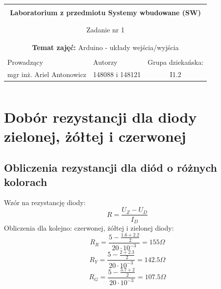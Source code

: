 \documentclass[polish,a4paper]{article}
\begin{document}
	\begin{center}
		\begin{tabular}{ p{} p{} p{} p{} p{} }
			
			&   &   &   &  \\
			\hline
			\multicolumn{5}{|c|}{}\\[-1ex]
			\multicolumn{5}{|c|}{{\LARGE \textbf{Laboratorium z przedmiotu Systemy wbudowane (SW)}}}\\
			\multicolumn{5}{|c|}{}\\[-1ex]
			\hline
			\hline
			
			\multicolumn{5}{|c|}{}\\[-1ex]
			\multicolumn{5}{|c|}{{\LARGE Zadanie nr 1}}\\
			\multicolumn{5}{|c|}{}\\[-1ex]
			\hline
			\hline
			
			\multicolumn{5}{|c|}{}\\[-1ex]
			\multicolumn{5}{|c|}{{\textbf{Temat zajęć:} Arduino - układy wejścia/wyjścia}}\\
			\multicolumn{5}{|c|}{}\\[-1ex]
			\hline
			\hline
			
			\multicolumn{1}{|l|}{Prowadzący} &
			\multicolumn{2}{|l|}{Autorzy} &
			\multicolumn{2}{|l|}{Grupa dziekańska:} \\
			\multicolumn{1}{|c|}{mgr inż. Ariel Antonowicz} &
			\multicolumn{2}{|c|}{148088 i 148121} &
			\multicolumn{2}{|c|}{I1.2} \\
			\hline
			\hline
		\end{tabular}
	\end{center}
	\[\]
	\section{Dobór rezystancji dla diody zielonej, żółtej i czerwonej}
	\subsection{Obliczenia rezystancji dla diód o różnych kolorach}
	Wzór na rezystancję diody:
	$$R = \frac{U_Z - U_D}{I_D}$$
	Obliczenia dla kolejno: czerwonej, żółtej i zielonej diody:
	$$R_R = \frac{5 - \frac{1.6 + 2.2}{2}}{20 \cdot 10^{-3}} = 155 \Omega$$
	$$R_Y = \frac{5 - \frac{2 + 2.3}{2}}{20 \cdot 10^{-3}} = 142.5 \Omega$$
	$$R_G = \frac{5 - \frac{3.7 + 2}{2}}{20 \cdot 10^{-3}} = 107.5 \Omega$$
\end{document}
